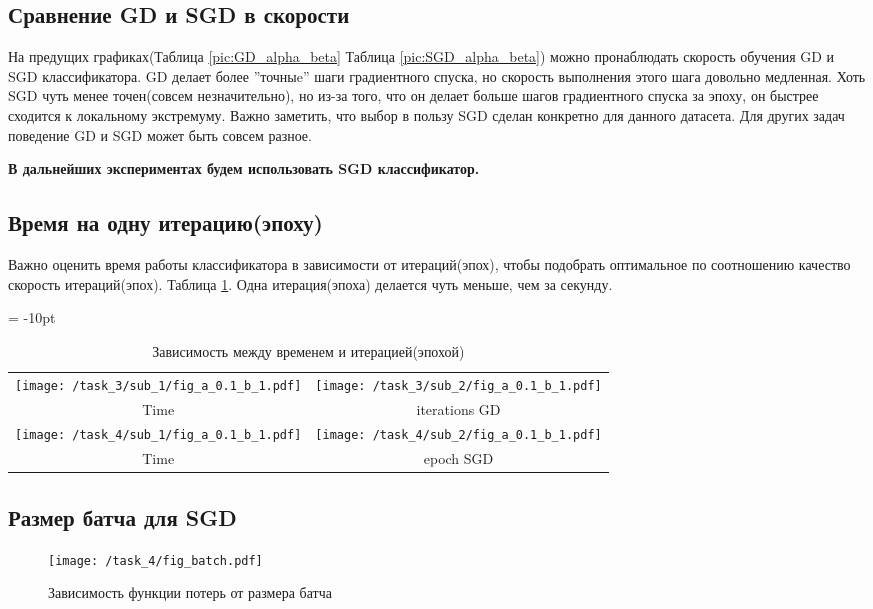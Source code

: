 \documentclass[12pt,fleqn]{article}
\begin{document}
\subsection{Сравнение GD и SGD в скорости}
На предущих графиках(Таблица \ref{pic:GD_alpha_beta} Таблица \ref{pic:SGD_alpha_beta})
можно пронаблюдать скорость обучения GD и SGD классификатора. GD делает более ''точныe''
шаги градиентного спуска, но скорость выполнения этого шага довольно медленная. 
Хоть SGD чуть менее точен(совсем незначительно), но из-за того,
что он делает больше шагов градиентного спуска за эпоху, он быстрее сходится к локальному экстремуму. 
Важно заметить, что выбор в пользу SGD сделан конкретно для данного датасета. Для других задач 
поведение GD и SGD может быть совсем разное.

\textbf{В дальнейших экспериментах будем использовать SGD классификатор.}

\subsection{Время на одну итерацию(эпоху)}
Важно оценить время работы классификатора в зависимости от итераций(эпох), чтобы подобрать
оптимальное по соотношению качество скорость итераций(эпох). Таблица \ref{pic:time_iter}.
Одна итерация(эпоха) делается чуть меньше, чем за секунду.

\begin{table}[htb]

    \centering
    \tabcolsep = -10pt
    \begin{tabular}{cc}
        \texttt{[image: /task\_3/sub\_1/fig\_a\_0.1\_b\_1.pdf]}  & 
        \texttt{[image: /task\_3/sub\_2/fig\_a\_0.1\_b\_1.pdf]} \\
        Time & iterations GD \\
         \texttt{[image: /task\_4/sub\_1/fig\_a\_0.1\_b\_1.pdf]} &
         \texttt{[image: /task\_4/sub\_2/fig\_a\_0.1\_b\_1.pdf]} \\
         Time & epoch SGD
    \end{tabular}
    \caption{Зависимость между временем и итерацией(эпохой)}
    \label{pic:time_iter}
\end{table}


\subsection{Размер батча для SGD}
\begin{wrapfigure}[13]{r}{0.5\textwidth}
    \texttt{[image: /task\_4/fig\_batch.pdf]} 
    \caption{Зависимость функции потерь от размера батча}
    \label{pic:batch}
\end{wrapfigure}
\end{document}

